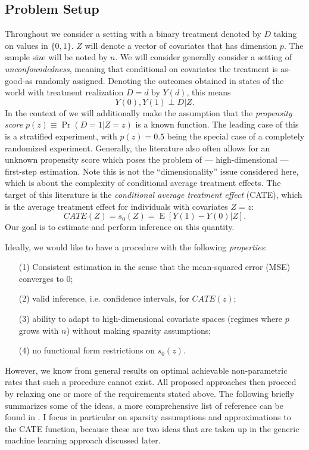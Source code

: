 \documentclass[11pt, a4paper, leqno]{article}
\DeclareMathOperator{\E}{E}
\begin{document}
\subsection{Problem Setup}
Throughout we consider a setting with a binary treatment denoted by $D$ taking on values in $\{0, 1\}$.
$Z$ will denote a vector of covariates that has dimension $p$. The sample size will be noted by $n$.
We will consider generally consider a setting of \textit{unconfoundedness}, meaning that conditional on covariates the treatment is as-good-as randomly assigned.
Denoting the outcomes obtained in states of the world with treatment realization $D=d$ by $Y(d)$, this means
\begin{equation*}
    Y(0), Y(1) \perp D | Z.
\end{equation*}
In the context of \cite{chernozhukov2023genml} we will additionally make the assumption that the \textit{propensity score} $p(z) \equiv \Pr(D=1|Z=z)$ is a known function.
The leading case of this is a stratified experiment, with $p(z) = 0.5$ being the special case of a completely randomized experiment.
Generally, the literature also often allows for an unknown propensity score which poses the problem of --- high-dimensional --- first-step estimation.
Note this is not the ``dimensionality'' issue considered here, which is about the complexity of conditional average treatment effects.
The target of this literature is the \textit{conditional average treatment effect} (CATE), which is the average treatment effect for individuals with covariates $Z=z$:
\begin{equation*}
    CATE(Z) = s_0(Z) = \E[Y(1) - Y(0)|Z].
\end{equation*}
Our goal is to estimate and perform inference on this quantity.

Ideally, we would like to have a procedure with the following \textit{properties}:
\begin{itemize}
    \item[(1)] Consistent estimation in the sense that the mean-squared error (MSE) converges to 0;
    \item[(2)] valid inference, i.e. confidence intervals, for $CATE(z)$;
    \item[(3)] ability to adapt to high-dimensional covariate spaces (regimes where $p$ grows with $n$) without making sparsity assumptions;
    \item[(4)] no functional form restrictions on $s_0(z)$.
\end{itemize}
However, we know from general results on optimal achievable non-parametric rates that such a procedure cannot exist.
All proposed approaches then proceed by relaxing one or more of the requirements stated above. The following briefly summarizes some of the ideas, a more comprehensive list of reference can be found in \cite{causalml2024}.
I focus in particular on sparsity assumptions and approximations to the CATE function, because these are two ideas that are taken up in the generic machine learning approach discussed later.
\end{document}
